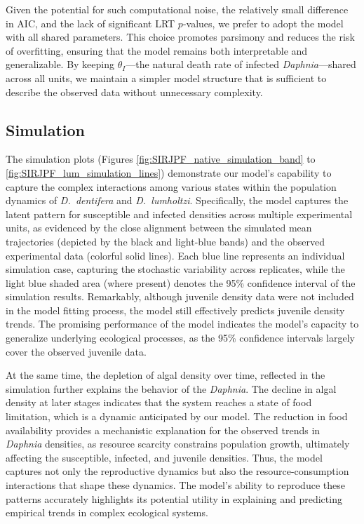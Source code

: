 \documentclass[aoas,preprint]{imsart}\usepackage[]{graphicx}\usepackage[]{xcolor}
\begin{document}
Given the potential for such computational noise, the relatively small difference in AIC, and the lack of significant LRT $p$-values, we prefer to adopt the model with all shared parameters.
This choice promotes parsimony and reduces the risk of overfitting, ensuring that the model remains both interpretable and generalizable.
By keeping $\theta_I$—the natural death rate of infected \textit{Daphnia}—shared across all units, we maintain a simpler model structure that is sufficient to describe the observed data without unnecessary complexity.

\subsection{Simulation}
The simulation plots (Figures \ref{fig:SIRJPF_native_simulation_band} to \ref{fig:SIRJPF_lum_simulation_lines}) demonstrate our model's capability to capture the complex interactions among various states within the population dynamics of \textit{D.~dentifera} and \textit{D.~lumholtzi}.
Specifically, the model captures the latent pattern for susceptible and infected densities across multiple experimental units, as evidenced by the close alignment between the simulated mean trajectories (depicted by the black and light-blue bands) and the observed experimental data (colorful solid lines).
Each blue line represents an individual simulation case, capturing the stochastic variability across replicates, while the light blue shaded area (where present) denotes the 95\% confidence interval of the simulation results.
Remarkably, although juvenile density data were not included in the model fitting process, the model still effectively predicts juvenile density trends.
The promising performance of the model indicates the model's capacity to generalize underlying ecological processes, as the 95\% confidence intervals largely cover the observed juvenile data.

\parskip 3mm

At the same time, the depletion of  algal density over time, reflected in the simulation further explains the behavior of the \textit{Daphnia}.
The decline in algal density at later stages indicates that the system reaches a state of food limitation, which is a dynamic anticipated by our model.
The reduction in food availability provides a mechanistic explanation for the observed trends in \textit{Daphnia} densities, as resource scarcity constrains population growth, ultimately affecting the susceptible, infected, and juvenile densities.
Thus, the model captures not only the reproductive dynamics but also the resource-consumption interactions that shape these dynamics.
The model’s ability to reproduce these patterns accurately highlights its potential utility in explaining and predicting empirical trends in complex ecological systems.
\end{document}
